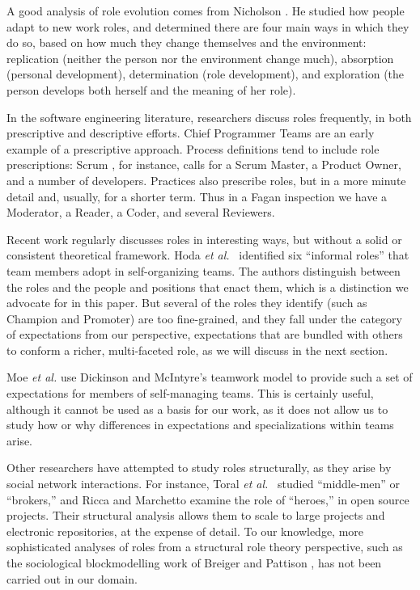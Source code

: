 \documentclass[10pt, conference, compsocconf]{IEEEtran}
\begin{document}
A good analysis of role evolution comes from Nicholson \cite{Nicholson1984}. He studied how people adapt to new work roles, and determined there are four main ways in which they do so, based on how much they change themselves and the environment: replication (neither the person nor the environment change much), absorption (personal development), determination (role development), and exploration (the person develops both herself and the meaning of her role).


In the software engineering literature, researchers discuss roles frequently, in both prescriptive and descriptive efforts. Chief Programmer Teams \cite{Baker1972} are an early example of a prescriptive approach. Process definitions tend to include role prescriptions: Scrum \cite{Schwaber2001}, for instance, calls for a Scrum Master, a Product Owner, and a number of developers. Practices also prescribe roles, but in a more minute detail and, usually, for a shorter term. Thus in a Fagan inspection \cite{Fagan1976} we have a Moderator, a Reader, a Coder, and several Reviewers.

Recent work regularly discusses roles in interesting ways, but without a solid or consistent theoretical framework. Hoda \emph{et al.}\ \cite{Hoda2010} identified six ``informal roles'' that team members adopt in self-organizing teams. The authors distinguish between the roles and the people and positions that enact them, which is a distinction we advocate for in this paper. But several of the roles they identify (such as Champion and Promoter) are too fine-grained, and they fall under the category of expectations from our perspective, expectations that are bundled with others to conform a richer, multi-faceted role, as we will discuss in the next section.

Moe \emph{et al.} \cite{Moe2010} use Dickinson and McIntyre's \cite{Dickinson1997} teamwork model to provide such a set of expectations for members of self-managing teams. This is certainly useful, although it cannot be used as a basis for our work, as it does not allow us to study how or why differences in expectations and specializations within teams arise.

Other researchers have attempted to study roles structurally, as they arise by social network interactions. For instance, Toral \emph{et al.}\ \cite{Toral2010} studied ``middle-men'' or ``brokers,'' and Ricca and Marchetto \cite{Ricca2010} examine the role of ``heroes,'' in open source projects. Their structural analysis allows them to scale to large projects and electronic repositories, at the expense of detail. To our knowledge, more sophisticated analyses of roles from a structural role theory perspective, such as the sociological blockmodelling work of Breiger and Pattison \cite{Breiger1986}, has not been carried out in our domain.
\end{document}
